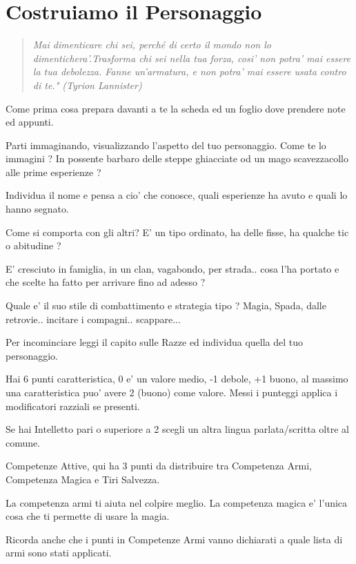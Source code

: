 \documentclass[a4paper,11pt,twoside,openany]{book}
\begin{document}
	
	\pagebreak
	
	\section{Costruiamo il Personaggio}
	
	\label{costruiamo-il-personaggio}
	\begin{quote}\textit{
			Mai dimenticare chi sei, perché di certo il mondo non lo dimentichera'.Trasforma chi sei nella tua forza, cosi' non potra' mai essere la tua debolezza. Fanne un'armatura, e non potra' mai essere usata contro di te." (Tyrion Lannister)
	}\end{quote}
	
	Come prima cosa prepara davanti a te la scheda ed un foglio dove prendere note ed appunti.
	
	Parti immaginando, visualizzando l'aspetto del tuo personaggio. Come te lo immagini ? In possente barbaro delle steppe ghiacciate od un mago scavezzacollo alle prime esperienze ?
	
	Individua il nome e pensa a cio' che conosce, quali esperienze ha avuto e quali lo hanno segnato.
	
	Come si comporta con gli altri? E' un tipo ordinato, ha delle fisse, ha qualche tic o abitudine ?
	
	E' cresciuto in famiglia, in un clan, vagabondo, per strada.. cosa l'ha portato e che scelte ha fatto per arrivare fino ad adesso ?
	
	Quale e' il suo stile di combattimento e strategia tipo ? Magia, Spada, dalle retrovie.. incitare i compagni.. scappare...
	
	Per incominciare leggi il capito sulle Razze ed individua quella del tuo personaggio.
	
	Hai 6 punti caratteristica, 0 e' un valore medio, -1 debole, +1 buono, al massimo una caratteristica puo' avere 2 (buono) come valore. Messi i punteggi applica i modificatori razziali se presenti.
	
	Se hai Intelletto pari o superiore a 2 scegli un altra lingua parlata/scritta oltre al comune.
	
	Competenze Attive, qui ha 3 punti da distribuire tra Competenza Armi, Competenza Magica e Tiri Salvezza.
	
	La competenza armi ti aiuta nel colpire meglio. La competenza magica e' l'unica cosa che ti permette di usare la magia.
	
	Ricorda anche che i punti in Competenze Armi vanno dichiarati a quale lista di armi sono stati applicati.
	
\end{document}
